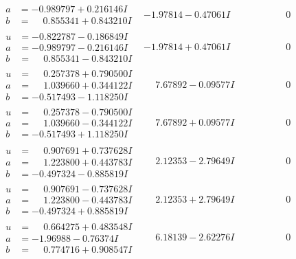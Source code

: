 \documentclass[1p]{elsarticle_modified}
\theoremstyle{definition}
\begin{document}
$$\begin{array}{c|c|c}
\begin{aligned}
a &= -0.989797 + 0.216146 I \\
b &= \phantom{-}0.855341 + 0.843210 I\end{aligned}
 & -1.97814 - 0.47061 I & \phantom{-0.000000 } 0 \\ \hline\begin{aligned}
u &= -0.822787 - 0.186849 I \\
a &= -0.989797 - 0.216146 I \\
b &= \phantom{-}0.855341 - 0.843210 I\end{aligned}
 & -1.97814 + 0.47061 I & \phantom{-0.000000 } 0 \\ \hline\begin{aligned}
u &= \phantom{-}0.257378 + 0.790500 I \\
a &= \phantom{-}1.039660 + 0.344122 I \\
b &= -0.517493 - 1.118250 I\end{aligned}
 & \phantom{-}7.67892 - 0.09577 I & \phantom{-0.000000 } 0 \\ \hline\begin{aligned}
u &= \phantom{-}0.257378 - 0.790500 I \\
a &= \phantom{-}1.039660 - 0.344122 I \\
b &= -0.517493 + 1.118250 I\end{aligned}
 & \phantom{-}7.67892 + 0.09577 I & \phantom{-0.000000 } 0 \\ \hline\begin{aligned}
u &= \phantom{-}0.907691 + 0.737628 I \\
a &= \phantom{-}1.223800 + 0.443783 I \\
b &= -0.497324 - 0.885819 I\end{aligned}
 & \phantom{-}2.12353 - 2.79649 I & \phantom{-0.000000 } 0 \\ \hline\begin{aligned}
u &= \phantom{-}0.907691 - 0.737628 I \\
a &= \phantom{-}1.223800 - 0.443783 I \\
b &= -0.497324 + 0.885819 I\end{aligned}
 & \phantom{-}2.12353 + 2.79649 I & \phantom{-0.000000 } 0 \\ \hline\begin{aligned}
u &= \phantom{-}0.664275 + 0.483548 I \\
a &= -1.96988 - 0.76374 I \\
b &= \phantom{-}0.774716 + 0.908547 I\end{aligned}
 & \phantom{-}6.18139 - 2.62276 I & \phantom{-0.000000 } 0\\

\end{array}$$
\end{document}
